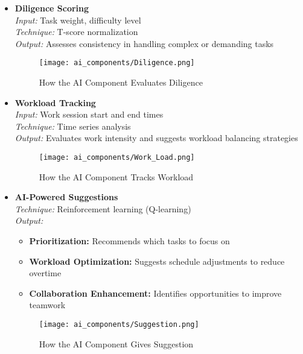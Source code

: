 \begin{itemize}
    \item \textbf{Diligence Scoring}  
    \\ \textit{Input:} Task weight, difficulty level  
    \\ \textit{Technique:} T-score normalization  
    \\ \textit{Output:} Assesses consistency in handling complex or demanding tasks 
    \begin{figure}[H]
        \centering
        \texttt{[image: ai\_components/Diligence.png]}
        \caption{How the AI Component Evaluates Diligence}
    \end{figure} 

    \item \textbf{Workload Tracking}  
    \\ \textit{Input:} Work session start and end times  
    \\ \textit{Technique:} Time series analysis  
    \\ \textit{Output:} Evaluates work intensity and suggests workload balancing strategies  
    \begin{figure}[H]
        \centering
        \texttt{[image: ai\_components/Work\_Load.png]}
        \caption{How the AI Component Tracks Workload}
    \end{figure}

    \item \textbf{AI-Powered Suggestions} 
    \\ \textit{Technique:} Reinforcement learning (Q-learning)  
    \\ \textit{Output:}  
    \begin{itemize}
        \item \textbf{Prioritization:} Recommends which tasks to focus on  
        \item \textbf{Workload Optimization:} Suggests schedule adjustments to reduce overtime  
        \item \textbf{Collaboration Enhancement:} Identifies opportunities to improve teamwork  
    \end{itemize}
    \begin{figure}[H]
        \centering
        \texttt{[image: ai\_components/Suggestion.png]}
        \caption{How the AI Component Gives Suggestion}
    \end{figure} 


\end{itemize}

